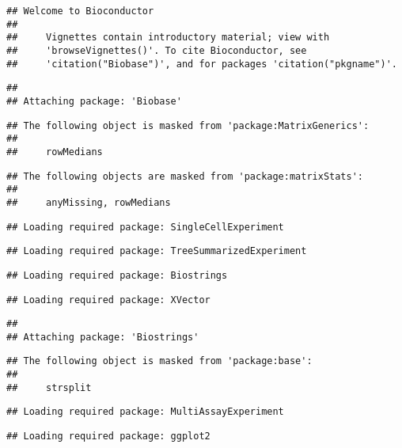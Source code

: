 \documentclass[
  oneside]{book}
\begin{document}
\begin{verbatim}
## Welcome to Bioconductor
## 
##     Vignettes contain introductory material; view with
##     'browseVignettes()'. To cite Bioconductor, see
##     'citation("Biobase")', and for packages 'citation("pkgname")'.
\end{verbatim}

\begin{verbatim}
## 
## Attaching package: 'Biobase'
\end{verbatim}

\begin{verbatim}
## The following object is masked from 'package:MatrixGenerics':
## 
##     rowMedians
\end{verbatim}

\begin{verbatim}
## The following objects are masked from 'package:matrixStats':
## 
##     anyMissing, rowMedians
\end{verbatim}

\begin{verbatim}
## Loading required package: SingleCellExperiment
\end{verbatim}

\begin{verbatim}
## Loading required package: TreeSummarizedExperiment
\end{verbatim}

\begin{verbatim}
## Loading required package: Biostrings
\end{verbatim}

\begin{verbatim}
## Loading required package: XVector
\end{verbatim}

\begin{verbatim}
## 
## Attaching package: 'Biostrings'
\end{verbatim}

\begin{verbatim}
## The following object is masked from 'package:base':
## 
##     strsplit
\end{verbatim}

\begin{verbatim}
## Loading required package: MultiAssayExperiment
\end{verbatim}

\begin{verbatim}
## Loading required package: ggplot2
\end{verbatim}
\end{document}
